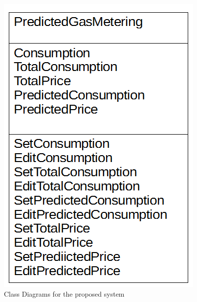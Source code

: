 \begin{figure}[H]
    \includegraphics[width=\textwidth]{./PredictedGasMetering.png}
    \caption{Class Diagrams for the proposed system} \label{fig:PredictedGasMetering Class Diagram}
\end{figure}
